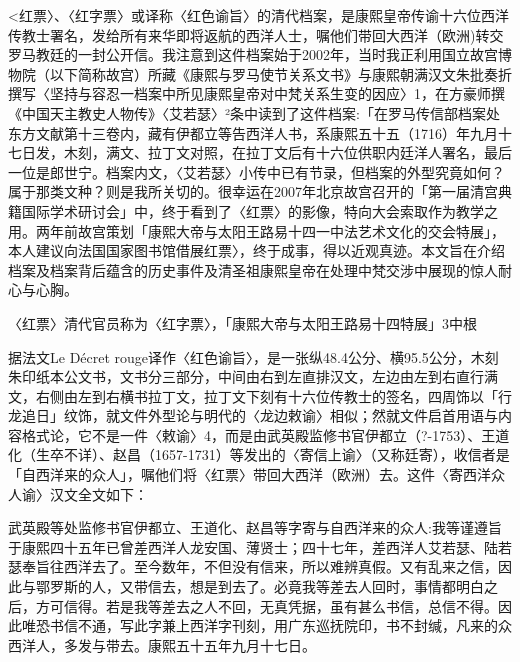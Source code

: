 <红票〉、〈红字票〉或译称〈红色谕旨〉的清代档案，是康熙皇帝传谕十六位西洋传教士署名，发给所有来华即将返航的西洋人士，嘱他们带回大西洋（欧洲)转交罗马教廷的一封公开信。我注意到这件档案始于2002年，当时我正利用国立故宫博物院（以下简称故宫）所藏《康熙与罗马使节关系文书》与康熙朝满汉文朱批奏折撰写〈坚持与容忍一档案中所见康熙皇帝对中梵关系生变的因应〉1，在方豪师撰《中国天主教史人物传》〈艾若瑟〉²条中读到了这件档案:「在罗马传信部档案处东方文献第十三卷内，藏有伊都立等告西洋人书，系康熙五十五（1716）年九月十七日发，木刻，满文、拉丁文对照，在拉丁文后有十六位供职内廷洋人署名，最后一位是郎世宁。档案内文，〈艾若瑟〉小传中已有节录，但档案的外型究竟如何？属于那类文种？则是我所关切的。很幸运在2007年北京故宫召开的「第一届清宫典籍国际学术研讨会」中，终于看到了〈红票〉的影像，特向大会索取作为教学之用。两年前故宫策划「康熙大帝与太阳王路易十四一中法艺术文化的交会特展」，本人建议向法国国家图书馆借展红票〉，终于成事，得以近观真迹。本文旨在介绍档案及档案背后蕴含的历史事件及清圣祖康熙皇帝在处理中梵交涉中展现的惊人耐心与心胸。


〈红票〉清代官员称为〈红字票〉，「康熙大帝与太阳王路易十四特展」3中根

\vfill
\begin{BookNotes}
\end{BookNotes}

\noindent 据法文Le Décret rouge译作〈红色谕旨〉，是一张纵48.4公分、横95.5公分，木刻朱印纸本公文书，文书分三部分，中间由右到左直排汉文，左边由左到右直行满文，右侧由左到右横书拉丁文，拉丁文下刻有十六位传教士的签名，四周饰以「行龙追日」纹饰，就文件外型论与明代的〈龙边敕谕〉相似；然就文件启首用语与内容格式论，它不是一件〈敕谕〉4，而是由武英殿监修书官伊都立（?-1753）、王道化（生卒不详）、赵昌（1657-1731）等发出的〈寄信上谕〉（又称廷寄），收信者是「自西洋来的众人」，嘱他们将〈红票〉带回大西洋（欧洲）去。这件〈寄西洋众人谕〉汉文全文如下：

\begin{BookQuote}
武英殿等处监修书官伊都立、王道化、赵昌等字寄与自西洋来的众人:我等谨遵旨于康熙四十五年已曾差西洋人龙安国、薄贤士；四十七年，差西洋人艾若瑟、陆若瑟奉旨往西洋去了。至今数年，不但没有信来，所以难辨真假。又有乱来之信，因此与鄂罗斯的人，又带信去，想是到去了。必竟我等差去人回时，事情都明白之后，方可信得。若是我等差去之人不回，无真凭据，虽有甚么书信，总信不得。因此唯恐书信不通，写此字兼上西洋字刊刻，用广东巡抚院印，书不封缄，凡来的众西洋人，多发与带去。康熙五十五年九月十七日。
\end{BookQuote}


